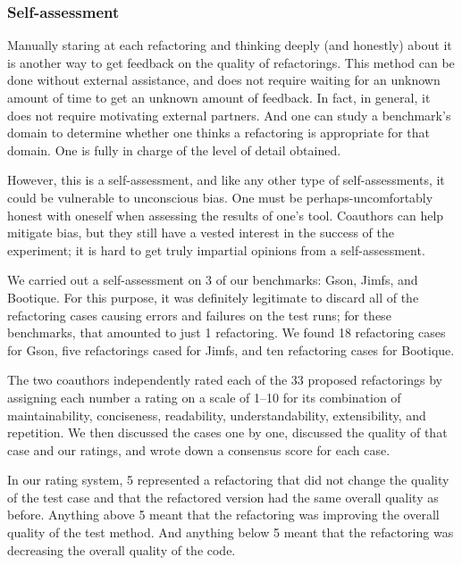 
\subsubsection{Self-assessment}
Manually staring at each refactoring and thinking deeply (and honestly) about it is another way to get feedback on the quality of refactorings. This method can be done without external assistance, and does not require waiting for an unknown amount of time to get an unknown amount of feedback. In fact, in general, it does not require motivating external partners. And one can study a benchmark's domain to determine whether one thinks a refactoring is appropriate for that domain. One is fully in charge of the level of detail obtained.

However, this is a self-assessment, and like any other type of self-assessments, it could be vulnerable to unconscious bias. One must be perhaps-uncomfortably honest with oneself when assessing the results of one's tool. Coauthors can help mitigate bias, but they still have a vested interest in the success of the experiment; it is hard to get truly impartial opinions from a self-assessment.

We carried out a self-assessment on 3 of our benchmarks: Gson, Jimfs, and Bootique. For this purpose, it was definitely legitimate to discard all of the refactoring cases causing errors and failures on the test runs; for these benchmarks, that amounted to just 1 refactoring. We found 18 refactoring cases for Gson, five refactorings cased for Jimfs, and ten refactoring cases for Bootique.

The two coauthors independently rated each of the 33 proposed refactorings by assigning each number a rating on a scale of 1--10 for its combination of maintainability, conciseness, readability, understandability, extensibility, and repetition. We then discussed the cases one by one, discussed the quality of that case and our ratings, and wrote down a consensus score for each case.

In our rating system, 5 represented a refactoring that did not change the quality of the test case and that the refactored version had the same overall quality as before. Anything above 5 meant that the refactoring was improving the overall quality of the test method. And anything below 5 meant that the refactoring was decreasing the overall quality of the code.

